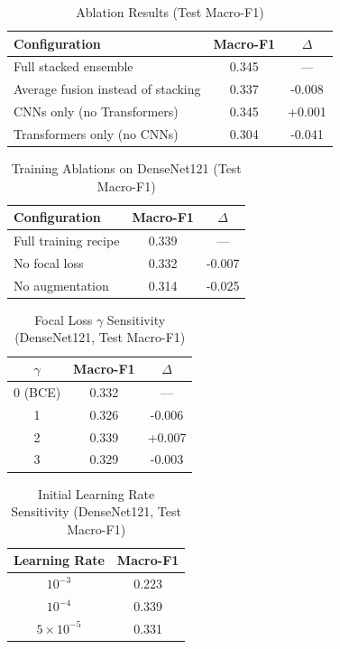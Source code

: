 \begin{table}[t]
\caption{Ablation Results (Test Macro-F1)}
\label{tab:ablation}
\centering
\begin{tabular}{lcc}
\toprule
Configuration & Macro-F1 & $\Delta$ \\
\midrule
Full stacked ensemble & 0.345 & --- \\
\quad Average fusion instead of stacking & 0.337 & -0.008 \\
\quad CNNs only (no Transformers) & 0.345 & +0.001 \\
\quad Transformers only (no CNNs) & 0.304 & -0.041 \\
\bottomrule
\end{tabular}
\end{table}

\begin{table}[t]
\caption{Training Ablations on DenseNet121 (Test Macro-F1)}
\label{tab:ablation_single}
\centering
\begin{tabular}{lcc}
\toprule
Configuration & Macro-F1 & $\Delta$ \\
\midrule
Full training recipe & 0.339 & --- \\
\quad No focal loss & 0.332 & -0.007 \\
\quad No augmentation & 0.314 & -0.025 \\
\bottomrule
\end{tabular}
\end{table}

\begin{table}[t]
\caption{Focal Loss $\gamma$ Sensitivity (DenseNet121, Test Macro-F1)}
\label{tab:gamma}
\centering
\begin{tabular}{ccc}
\toprule
$\gamma$ & Macro-F1 & $\Delta$ \\
\midrule
0 (BCE) & 0.332 & --- \\
1 & 0.326 & -0.006 \\
2 & 0.339 & +0.007 \\
3 & 0.329 & -0.003 \\
\bottomrule
\end{tabular}
\end{table}

\begin{table}[t]
\caption{Initial Learning Rate Sensitivity (DenseNet121, Test Macro-F1)}
\label{tab:lr}
\centering
\begin{tabular}{cc}
\toprule
Learning Rate & Macro-F1 \\
\midrule
$10^{-3}$ & 0.223 \\
$10^{-4}$ & 0.339 \\
$5\times10^{-5}$ & 0.331 \\
\bottomrule
\end{tabular}
\end{table}
